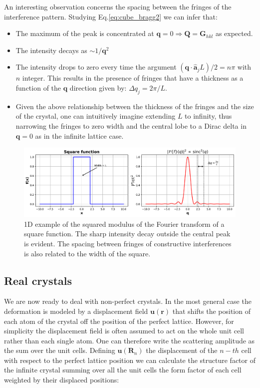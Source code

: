 An interesting observation concerns the spacing between the fringes of the interference pattern. Studying Eq.\ref{eq:cube_bragg2}
we can infer that:  

\begin{itemize}
    \item The maximum of the peak is concentrated at $\mathbf q = 0  \Rightarrow \mathbf Q = \mathbf{G}_{hkl}$ as expected. 
    \item The intensity decays as $ \sim 1/\mathbf{q}^2$
    \item The 
    intensity drops to zero every time the argument $(\mathbf{q} \cdot \mathbf{\hat{a}}_j L) /2 = n\pi$ with $n$ integer. 
    This results in the presence of fringes that have a thickness as a function of the $\mathbf q$ direction given by:
    $\Delta q_j = 2\pi/L$. 
    \item Given the above relationship between the thickness of the fringes and the size of the crystal, one can intuitively
    imagine extending $L$ to infinity, thus narrowing the fringes to zero width and the central lobe to a Dirac delta in $\mathbf{q} = 0$ 
    as in the infinite lattice case. 
\end{itemize}

\begin{figure}[H]
    \centering
    \includegraphics[width=\textwidth]{figures/Intro/square.pdf}
    \caption{1D example of the squared modulus of the Fourier transform of a square function. The sharp intensity decay 
     outside the central peak is evident. The spacing between fringes of constructive interferences is also related 
     to the width of the square.}
    \label{fig:square_ft}
\end{figure}

\subsection{Real crystals}
We are now ready to deal with non-perfect crystals. In the most general case the deformation is modeled by a displacement field $\mathbf{u(r)}$ 
that shifts the position of each atom of the crystal off the position of the perfect lattice. However, for simplicity 
the displacement field is often assumed to act on the whole unit cell rather than each single atom. One can therefore 
write the scattering amplitude as the sum over the unit cells. 
Defining $\mathbf{u}(\mathbf{R}_n)$ the displacement of the $n-th$ cell with respect to the perfect lattice position 
we can calculate the structure factor of the infinite crystal summing over all the unit cells the form factor of each cell weighted by 
their displaced positions: 

